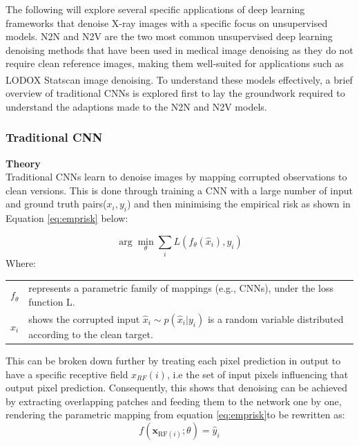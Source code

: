 The following will explore several specific applications of deep learning frameworks that denoise X-ray images with a specific focus on unsupervised models. \gls{N2N} and \gls{N2V} are the two most common unsupervised deep learning denoising methods that have been used in medical image denoising as they do not require clean reference images, making them well-suited for applications such as LODOX\textsuperscript{\textregistered} Statscan\textsuperscript{\textregistered} image denoising. To understand these models effectively, a brief overview of traditional \gls{CNN}s is explored first to lay the groundwork required to understand the adaptions made to the \gls{N2N} and \gls{N2V} models.

\subsubsection*{Traditional \gls{CNN}}
\textbf{Theory} \\
Traditional \gls{CNN}s learn to denoise images by mapping corrupted observations to clean versions.  This is done through training a \gls{CNN} with a large number of input and ground truth pairs($x_i,y_i$) and then minimising the empirical risk as shown in Equation \ref{eq:emprisk} below:


\begin{equation}
	\arg\min_{\theta} \sum_{i} L\left( f_{\theta}(\hat{x}_i), y_i \right)
	\label{eq:emprisk}
\end{equation}
Where:
\begin{table}[h!]
	\begin{tabular}{ll}
		$f_{\theta}$ & represents a parametric family of mappings (e.g., \gls{CNN}s), under the loss function L.  \\
		$\hat{x}_i$ & shows the corrupted input $\hat{x}_i \sim p(\hat{x}_i | y_i)$  is a random variable distributed according to the clean target.\\
	\end{tabular}
\end{table}

This can be broken down further by treating each pixel prediction in output to have a specific receptive field $x_{RF}(i)$, i.e the set of input pixels influencing that output pixel prediction. Consequently, this shows that denoising can be achieved by extracting overlapping patches and feeding them to the network one by one, rendering the parametric mapping from equation \ref{eq:emprisk}to be rewritten as:
\begin{equation}
	f({{\mathbf{x}}_{{\text{RF}}(i)}};\theta ) = {\hat y_i}
	\label{eq:parmap}
\end{equation}

